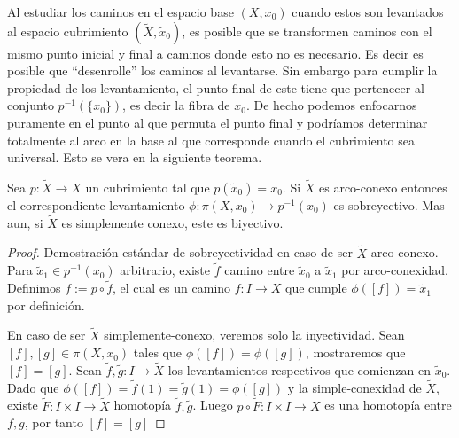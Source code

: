 Al estudiar los caminos en el espacio base \(\left(X, x_0 \right)\)
cuando estos son levantados al espacio cubrimiento \((\tilde X ,
\tilde x _0 )\), es posible que se transformen caminos con el mismo
punto inicial y final a caminos donde esto no es necesario. Es decir es
posible que ``desenrolle'' los caminos al levantarse. Sin embargo para
cumplir la propiedad de los levantamiento, el punto final de este tiene
que pertenecer al conjunto \(p^{-1} \left( \{x_0\} \right)\), es decir
la fibra de \(x_0\). De hecho podemos enfocarnos puramente en el punto
al que permuta el punto final y podríamos determinar totalmente al arco
en la base al que corresponde cuando el cubrimiento sea universal. Esto
se vera en la siguiente teorema.
\begin{teorema} \label{thm:phi-bijec}
  Sea \(p : \tilde X \to X\) un cubrimiento tal que \(p (\tilde x _0) =
  x_0\). Si \(\tilde X\) es arco-conexo entonces el correspondiente
  levantamiento \(\phi : \pi (X, x _0) \to p^{-1} (x_0)\) es
  sobreyectivo. Mas aun, si \(\tilde X\) es simplemente conexo, este es
  biyectivo.
\end{teorema}
\begin{proof}
  Demostración estándar de sobreyectividad en caso de ser \(\tilde X\)
  arco-conexo. Para \(\tilde x _1 \in p^{-1} (x_0)\) arbitrario, existe
  \(\tilde f\) camino entre \(\tilde x _0 \) a \(\tilde x _1\) por
  arco-conexidad. Definimos \(f := p \circ \tilde f\), el cual es un
  camino \(f : I \to X\) que cumple \(\phi ([f]) = \tilde x _1\) por
  definición.

  En caso de ser \(\tilde X\) simplemente-conexo, veremos solo la
  inyectividad. Sean \([f],[g] \in \pi (X, x_0)\) tales que \(\phi([f])
  = \phi([g])\), mostraremos que \([f] = [g]\). Sean \(\tilde f, \tilde
  g : I \to \tilde X\) los levantamientos respectivos que comienzan en
  \(\tilde x _0\). Dado que \(\phi([f]) = \tilde f (1) = \tilde g (1) =
  \phi([g])\) y la simple-conexidad de \(\tilde X\), existe \(\tilde F :
  I \times I \to \tilde X\) homotopía \(\tilde f, \tilde g\). Luego \(p
  \circ \tilde F : I \times I \to X \) es una homotopía entre \(f, g\),
  por tanto \([f] = [g]\)
\end{proof}
